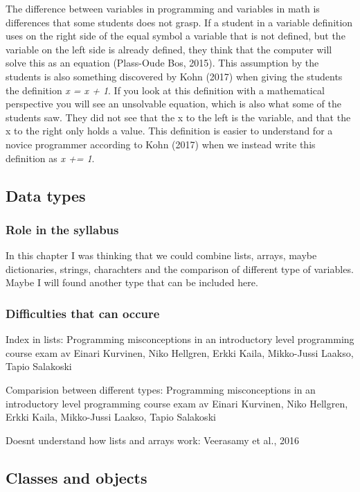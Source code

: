 \documentclass[twocolumn]{article}
\begin{document}
The difference between variables in programming and variables in math is differences that some students does not grasp. If a student in a variable definition uses on the right side of the equal symbol a variable that is not defined, but the variable on the left side is already defined, they think that the computer will solve this as an equation (Plass-Oude Bos, 2015). This assumption by the students is also something discovered by Kohn (2017) when giving the students the definition \emph{x = x + 1}. If you look at this definition with a mathematical perspective you will see an unsolvable equation, which is also what some of the students saw. They did not see that the x to the left is the variable, and that the x to the right only holds a value. This definition is  easier to understand for a novice programmer according to Kohn (2017) when we instead write this definition as \emph{x += 1}. 


\subsection{Data types}

\subsubsection{Role in the syllabus}

In this chapter I was thinking that we could combine lists, arrays, maybe dictionaries, strings, charachters and the comparison of different type of variables. Maybe I will found another type that can be included here. 

\subsubsection{Difficulties that can occure}



Index in lists: Programming misconceptions in an introductory level programming course exam av Einari Kurvinen, Niko Hellgren, Erkki Kaila, Mikko-Jussi Laakso, Tapio Salakoski

Comparision between different types: Programming misconceptions in an introductory level programming course exam av Einari Kurvinen, Niko Hellgren, Erkki Kaila, Mikko-Jussi Laakso, Tapio Salakoski

Doesnt understand how lists and arrays work: Veerasamy et al., 2016

\subsection{Classes and objects}
\end{document}
